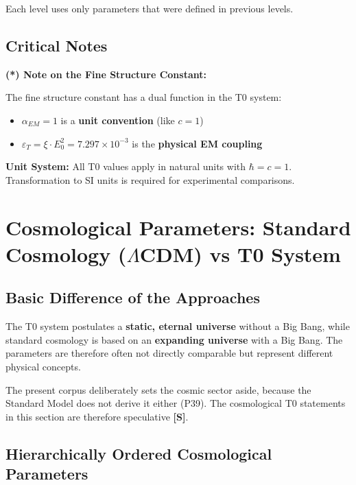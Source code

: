 Each level uses only parameters that were defined in previous levels.

\subsection{Critical Notes}
\label{subsec:critical_notes}

\textbf{(*) Note on the Fine Structure Constant:}

The fine structure constant has a dual function in the T0 system:
\begin{itemize}
	\item $\alpha_{EM} = 1$ is a \textbf{unit convention} (like $c = 1$)
	\item $\varepsilon_T = \xi \cdot E_0^2 = 7.297 \times 10^{-3}$ is the \textbf{physical EM coupling}
\end{itemize}

\textbf{Unit System:}
All T0 values apply in natural units with $\hbar = c = 1$. Transformation to SI units is required for experimental comparisons.
\section{Cosmological Parameters: Standard Cosmology ($\Lambda$CDM) vs T0 System}
\label{sec:cosmic_t0_mapping}

\subsection{Basic Difference of the Approaches}
\label{subsec:paradigm_shift}

\begin{tcolorbox}[colback=red!5!white,colframe=red!75!black,title=Note: Basic Differences]
	The T0 system postulates a \textbf{static, eternal universe} without a Big Bang, while standard cosmology is based on an \textbf{expanding universe} with a Big Bang. The parameters are therefore often not directly comparable but represent different physical concepts.

	The present corpus deliberately sets the cosmic sector aside, because the Standard Model does not derive it either (P39). The cosmological T0 statements in this section are therefore speculative \textbf{[S]}.
\end{tcolorbox}

\subsection{Hierarchically Ordered Cosmological Parameters}
\label{subsec:cosmic_hierarchical_mapping}

